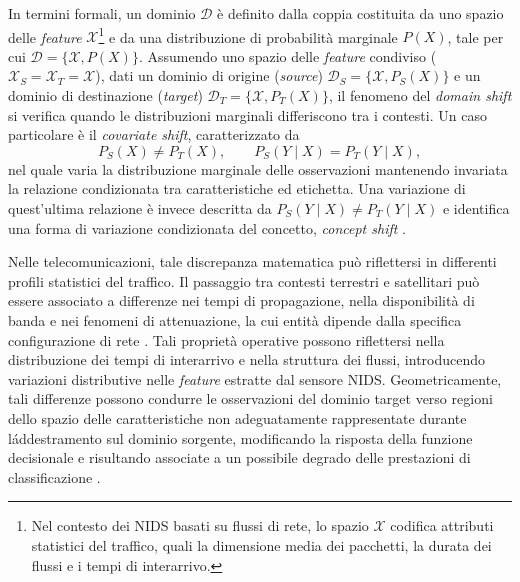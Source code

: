 In termini formali, un dominio $\mathcal{D}$ è definito dalla coppia costituita da uno spazio delle \textit{feature} $\mathcal{X}$\footnote{Nel contesto dei NIDS basati su flussi di rete, lo spazio $\mathcal{X}$ codifica attributi statistici del traffico, quali la dimensione media dei pacchetti, la durata dei flussi e i tempi di interarrivo.} e da una distribuzione di probabilità marginale $P(X)$, tale per cui $\mathcal{D}=\{\mathcal{X},P(X)\}$. 
Assumendo uno spazio delle \textit{feature} condiviso ($\mathcal{X}_S=\mathcal{X}_T=\mathcal{X}$), dati un dominio di origine (\textit{source}) $\mathcal{D}_S=\{\mathcal{X},P_S(X)\}$ e un dominio di destinazione (\textit{target}) $\mathcal{D}_T=\{\mathcal{X},P_T(X)\}$, il fenomeno del \textit{domain shift} si verifica quando le distribuzioni marginali differiscono tra i contesti.
Un caso particolare è il \textit{covariate shift}, caratterizzato da
\[ P_S(X)\neq P_T(X), \qquad P_S(Y\mid X)=P_T(Y\mid X), \]
nel quale varia la distribuzione marginale delle osservazioni mantenendo invariata la relazione condizionata tra caratteristiche ed etichetta. 
Una variazione di quest'ultima relazione è invece descritta da
$P_S(Y\mid X)\neq P_T(Y\mid X)$
e identifica una forma di variazione condizionata del concetto, \textit{concept shift} \cite{pan2010}.

Nelle telecomunicazioni, tale discrepanza matematica può riflettersi in differenti profili statistici del traffico. 
Il passaggio tra contesti terrestri e satellitari può essere associato a differenze nei tempi di propagazione, nella disponibilità di banda e nei fenomeni di attenuazione, la cui entità dipende dalla specifica configurazione di rete \cite{kodheli2021, azar2023}. 
Tali proprietà operative possono riflettersi nella distribuzione dei tempi di interarrivo e nella struttura dei flussi, introducendo variazioni distributive nelle \textit{feature} estratte dal sensore NIDS. 
Geometricamente, tali differenze possono condurre le osservazioni del dominio target verso regioni dello spazio delle caratteristiche non adeguatamente rappresentate durante l\'addestramento sul dominio sorgente, modificando la risposta della funzione decisionale e risultando associate a un possibile degrado delle prestazioni di classificazione \cite{farahani2021}.


